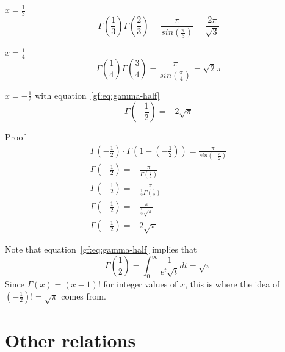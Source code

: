 \documentclass[a4paper]{article}
\begin{document}
    $x = \frac{1}{3}$
    \begin{equation}
        \Gamma(\frac{1}{3}) \Gamma(\frac{2}{3}) = \frac{\pi}{sin(\frac{\pi}{3})} = \frac{2\pi}{\sqrt{3}} \label{gf:eq:equation7}
    \end{equation}

    $x = \frac{1}{4}$
    \begin{equation}
        \Gamma(\frac{1}{4}) \Gamma(\frac{3}{4}) = \frac{\pi}{sin(\frac{\pi}{4})} = \sqrt{2} \pi \label{gf:eq:equation8}
    \end{equation}

    \begin{theorem}
        $x = -\frac{1}{2}$ with equation~\ref{gf:eq:gamma-half}
        \begin{equation}
            \label{gf:eq:negative-gamma-half}
            \Gamma(-\frac{1}{2}) = -2 \sqrt{\pi}
        \end{equation}

        Proof
        \\
        \begin{gather*}
            \Gamma(-\frac{1}{2}) \cdot \Gamma(1-(-\frac{1}{2})) = \frac{\pi}{sin(-\frac{\pi}{2})}
            \\
            \Gamma(-\frac{1}{2}) = -\frac{\pi}{\Gamma(\frac{3}{2})}
            \\
            \Gamma(-\frac{1}{2}) = -\frac{\pi}{\frac{1}{2} \Gamma(\frac{1}{2})}
            \\
            \Gamma(-\frac{1}{2}) = -\frac{\pi}{\frac{1}{2} \sqrt{\pi}}
            \\
            \Gamma(-\frac{1}{2}) = -2\sqrt{\pi}
        \end{gather*}

    \end{theorem}



    Note that equation~\ref{gf:eq:gamma-half} implies that
    \begin{equation}
        \Gamma(\frac{1}{2}) = \int_{0}^{\infty} \frac{1}{e^t \sqrt{t}} dt = \sqrt{\pi} \label{gf:eq:equation9}
    \end{equation}
    Since $\Gamma(x) = (x-1)!$ for integer values of $x$, this is where the idea of $(-\frac{1}{2})! = \sqrt{\pi}$ comes from.


    \section{Other relations}\label{gf:sec:other-relations}
\end{document}
